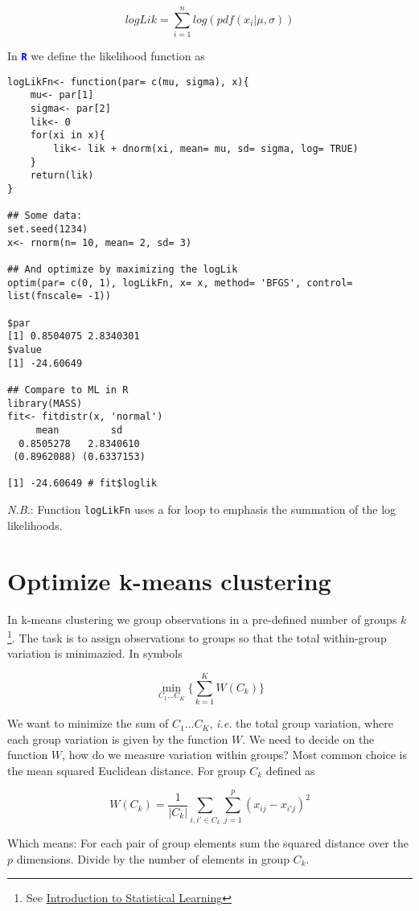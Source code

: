 \documentclass[a4paper]{article}
\newcommand{\R}{\textbf{\texttt{\textcolor{Blue}{R}} }}
\begin{document}
$$
logLik= \sum_{i= 1}^{n} log(pdf(x_i | \mu, \sigma))
$$

In \R we define the likelihood function as

\begin{verbatim}
logLikFn<- function(par= c(mu, sigma), x){
    mu<- par[1]
    sigma<- par[2]
    lik<- 0
    for(xi in x){
        lik<- lik + dnorm(xi, mean= mu, sd= sigma, log= TRUE)
    }
    return(lik)
}

## Some data:
set.seed(1234)
x<- rnorm(n= 10, mean= 2, sd= 3)

## And optimize by maximizing the logLik
optim(par= c(0, 1), logLikFn, x= x, method= 'BFGS', control= list(fnscale= -1))

$par
[1] 0.8504075 2.8340301
$value
[1] -24.60649

## Compare to ML in R
library(MASS)
fit<- fitdistr(x, 'normal')
     mean         sd    
  0.8505278   2.8340610 
 (0.8962088) (0.6337153)

[1] -24.60649 # fit$loglik

\end{verbatim}

\emph{N.B.}: Function \texttt{logLikFn} uses a for loop to emphasis the summation of the log likelihoods.

\section{Optimize k-means clustering}

In k-means clustering we group observations in a pre-defined number of groups $k$
\footnote{See \href{http://www-bcf.usc.edu/~gareth/ISL/}{Introduction to Statistical Learning}}.
The task is to assign observations to groups so that the total within-group variation
is minimazied. In symbols

$$
\displaystyle{\min_{C_1 \dots C_K} \{ \sum_{k= 1}^{K}} W(C_k) \}
$$

We want to minimize the sum of $C_1 \dots C_K$, \emph{i.e.} the total group variation, where each group variation is given by
the function $W$. We need to decide on the function $W$, how do we measure variation within groups?
Most common choice is the mean squared Euclidean distance. For group $C_k$ defined as

$$
W(C_k) = \frac{1}{|C_k|} \sum_{i, i\prime \in C_k}^{} \sum_{j =1}^{p} (x_{i j} - x_{i\prime j})^2
$$

Which means: For each pair of group elements sum the squared distance over the $p$ dimensions.
Divide by the number of elements in group $C_k$.
\end{document}
